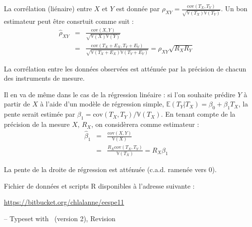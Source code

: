 La corrélation (liénaire) entre $X$ et $Y$ est donnée par
$\rho_{XY}=\frac{\text{cov}(T_X,T_Y)}{\sqrt{\mathbb{V}(T_X)\mathbb{V}(T_Y)}}$.
Un bon estimateur peut être consrtuit comme suit :
\begin{eqnarray}\label{eq:corr}
	\hat\rho_{XY} & = & \frac{\text{cov}(X,Y)}{\sqrt{\mathbb{V}(X)\mathbb{V}(Y)}}\nonumber\\
	              & = &
                      \frac{\text{cov}(T_X+E_X,T_Y+E_Y)}{\sqrt{\mathbb{V}(T_X+E_X)\mathbb{V}(T_Y+E_Y)}}
                  =\rho_{XY}\sqrt{R_XR_Y}
\end{eqnarray}

La corrélation entre les données observées est atténuée par la précision de
chacun des instruments de mesure.

\foilhead{}
Il en va de même dans le cas de la régression linéaire : si l'on souhaite
prédire $Y$ à partir de $X$ à l'aide d'un modèle de régression simple,
$\mathbb{E}(T_Y|T_X)=\beta_0+\beta_1T_X$, la pente serait estimée par
$\beta_1=\text{cov}(T_X,T_Y)/\mathbb{V}(T_X)$. En tenant compte de la précision de
la mesure $X$, $R_X$, on considèrera comme estimateur :
\begin{eqnarray}\label{eq:slope}
	\hat\beta_1 & = & \frac{\text{cov}(X,Y)}{\mathbb{V}(X)}\nonumber\\          
              & = & \frac{R_X\text{cov}(T_X,T_Y)}{\mathbb{V}(T_X)}=R_X\beta_1
\end{eqnarray}

La pente de la droite de régression est atténuée (c.a.d. ramenée vers 0).

\foilhead{}

Fichier de données et scripts R disponibles à l'adresse suivante :\newline
{\centering \url{https://bitbucket.org/chlalanne/eespe11}\par}
\vfill

\raggedleft \scriptsize -- Typeset with \FoilTeX\ (version 2), Revision \VCRevision


